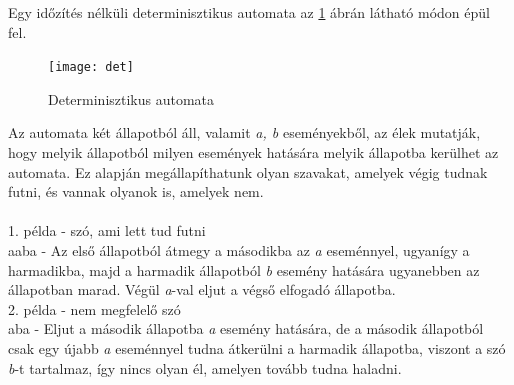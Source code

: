 \documentclass [12pt]{report}
\begin{document}
 Egy időzítés nélküli determinisztikus automata az \ref{tab:det} ábrán látható módon épül fel.\\
 \begin{figure}
 \begin{center}
 \label{tab:det}
 \texttt{[image: det]}
  \caption{Determinisztikus automata}
 \end{center}
 \end{figure}
 
 Az automata két állapotból áll, valamit \emph{a, b} eseményekből, az élek mutatják, hogy melyik állapotból milyen események hatására melyik állapotba kerülhet az automata. Ez alapján megállapíthatunk olyan szavakat, amelyek végig tudnak futni, és vannak olyanok is, amelyek nem.\\\\
 1. példa - szó, ami lett tud futni\\
 aaba - Az első állapotból átmegy a másodikba az \emph{a} eseménnyel, ugyanígy a harmadikba, majd a harmadik állapotból \emph{b} esemény hatására ugyanebben az állapotban marad. Végül \emph{a}-val eljut a végső elfogadó állapotba. \\
 2. példa - nem megfelelő szó\\
 aba - Eljut a második állapotba \emph{a} esemény hatására, de a második állapotból csak egy újabb \emph{a} eseménnyel tudna átkerülni a harmadik állapotba, viszont a szó \emph{b}-t tartalmaz, így nincs olyan él, amelyen tovább tudna haladni.\\
 

 
 
\end{document}
